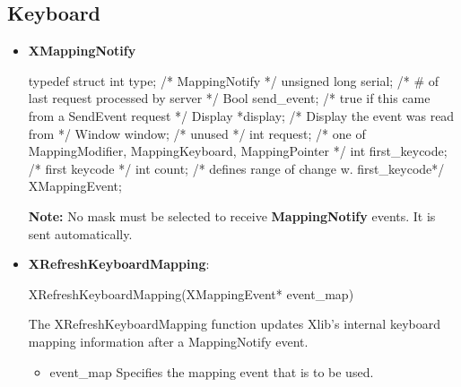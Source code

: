 \documentclass{report}
\begin{document}
    \pagebreak 
    \subsection{Keyboard}
    \begin{itemize}
        \item \textbf{XMappingNotify}
            \bigbreak \noindent 
            \begin{cppcode}
                typedef struct {
                    int type;               /* MappingNotify */
                    unsigned long serial;   /* # of last request processed by server */
                    Bool send_event;        /* true if this came from a SendEvent request */
                    Display *display;       /* Display the event was read from */
                    Window window;          /* unused */
                    int request;            /* one of MappingModifier, MappingKeyboard,
                    MappingPointer */
                    int first_keycode;      /* first keycode */
                    int count;              /* defines range of change w. first_keycode*/
                } XMappingEvent;
            \end{cppcode}
            \bigbreak \noindent 
            \textbf{Note:} No mask must be selected to receive \textbf{MappingNotify} events. It is sent automatically.
        \item \textbf{XRefreshKeyboardMapping}:
            \bigbreak \noindent 
            \begin{cppcode}
            XRefreshKeyboardMapping(XMappingEvent* event_map)
            \end{cppcode}
            \bigbreak \noindent
            The XRefreshKeyboardMapping function updates Xlib's internal keyboard mapping information after a MappingNotify event.
            \begin{itemize}
                \item event\_map Specifies the mapping event that is to be used.
            \end{itemize}


\end{itemize}
\end{document}
